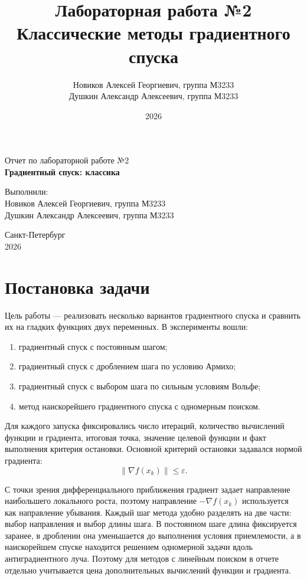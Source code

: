 \documentclass[14pt,a4paper]{extarticle}
\title{Лабораторная работа №2\\Классические методы градиентного спуска}
\author{
    Новиков Алексей Георгиевич, группа М3233\\
    Душкин Александр Алексеевич, группа М3233
}
\date{2026}
\begin{document}
\hypersetup{pageanchor=false}
\begin{titlepage}
    \begin{center}
        {\large Отчет по лабораторной работе №2}\\[0.5cm]
        {\LARGE \textbf{Градиентный спуск: классика}}\\[2cm]

        \begin{flushright}
            Выполнили:\\[0.2cm]
            Новиков Алексей Георгиевич, группа М3233\\
            Душкин Александр Алексеевич, группа М3233\\[0.5cm]
        \end{flushright}

        \vfill
        Санкт-Петербург\\[0.2cm]
        2026
    \end{center}
\end{titlepage}
\hypersetup{pageanchor=true}

\tableofcontents
\newpage

\section{Постановка задачи}

Цель работы --- реализовать несколько вариантов градиентного спуска и сравнить их на гладких функциях двух переменных.
В эксперименты вошли:
\begin{enumerate}
    \item градиентный спуск с постоянным шагом;
    \item градиентный спуск с дроблением шага по условию Армихо;
    \item градиентный спуск с выбором шага по сильным условиям Вольфе;
    \item метод наискорейшего градиентного спуска с одномерным поиском.
\end{enumerate}

Для каждого запуска фиксировались число итераций, количество вычислений функции и градиента, итоговая точка, значение целевой функции и факт выполнения критерия остановки.
Основной критерий остановки задавался нормой градиента:
\[
    \|\nabla f(x_k)\| \le \varepsilon.
\]

С точки зрения дифференциального приближения градиент задает направление наибольшего локального роста, поэтому направление $-\nabla f(x_k)$ используется как направление убывания. Каждый шаг метода удобно разделять на две части: выбор направления и выбор длины шага. В постоянном шаге длина фиксируется заранее, в дроблении она уменьшается до выполнения условия приемлемости, а в наискорейшем спуске находится решением одномерной задачи вдоль антиградиентного луча. Поэтому для методов с линейным поиском в отчете отдельно учитывается цена дополнительных вычислений функции и градиента.
\end{document}
